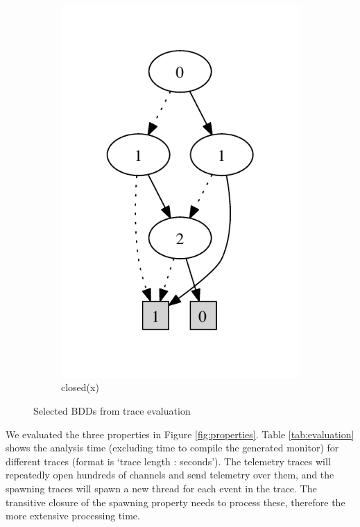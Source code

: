 \begin{figure}
\begin{subfigure}[b]{0.15\textwidth}
        \includegraphics[width=\textwidth]{figures/bdd3.pdf}
        \caption{closed(x)}
        \label{fig:bdd3}
    \end{subfigure}
    \caption{Selected BDDs from trace evaluation}
    \label{fig:bdds}
\end{figure}

%
We evaluated the three properties in Figure 
\ref{fig:properties}. Table \ref{tab:evaluation} shows the  
analysis time (excluding time to compile the generated 
monitor) for different traces (format is `trace length : seconds'). The telemetry traces will repeatedly open hundreds of channels and send telemetry over them, and the spawning traces will spawn a new thread for each event in the trace. The transitive closure of the spawning property needs to process these, therefore the more extensive processing time.

